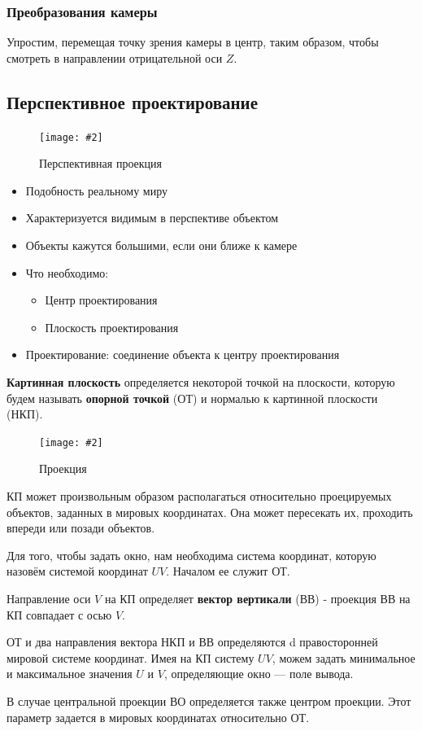 \documentclass[a4paper, 14pt]{extarticle}
\newcommand{\screenshot}[3]{
	\begin{figure}[h]
		\centering
		\texttt{[image: \#2]}
		\caption{#3}
	\end{figure}
}
\begin{document}
\subsubsection{Преобразования камеры}
Упростим, перемещая точку зрения камеры в центр, таким образом, чтобы смотреть в направлении отрицательной оси $Z$.

\subsection{Перспективное проектирование}
\screenshot{width=9cm}{l5/S024.jpg}{Перспективная проекция}
\begin{itemize}
	\item Подобность реальному миру
	\item Характеризуется видимым в перспективе объектом
	\item Объекты кажутся большими, если они ближе к камере
	\item Что необходимо:
	\begin{itemize}
		\item Центр проектирования
		\item Плоскость проектирования
	\end{itemize}
	\item Проектирование: соединение объекта к центру проектирования
\end{itemize}
\textbf{Картинная плоскость} определяется некоторой точкой на плоскости, которую будем называть \textbf{опорной точкой} (ОТ) и
нормалью к картинной плоскости (НКП). 

\screenshot{width=9cm}{l5/S025.jpg}{Проекция}

КП может произвольным образом располагаться относительно проецируемых объектов, заданных в мировых координатах. Она может пересекать их, проходить впереди или  позади объектов.

Для того, чтобы задать окно, нам необходима система координат, которую назовём системой координат $UV$. Началом ее служит ОТ.

Направление оси $V$ на КП определяет \textbf{вектор вертикали} (ВВ) - проекция ВВ на КП совпадает с осью $V$.

ОТ и два направления вектора НКП и ВВ определяются d правосторонней мировой системе координат. Имея на КП систему $UV$, можем задать минимальное и максимальное значения $U$ и $V$, определяющие окно — поле вывода.

В случае центральной проекции ВО определяется также центром проекции. Этот параметр задается в мировых координатах относительно ОТ.
\end{document}
